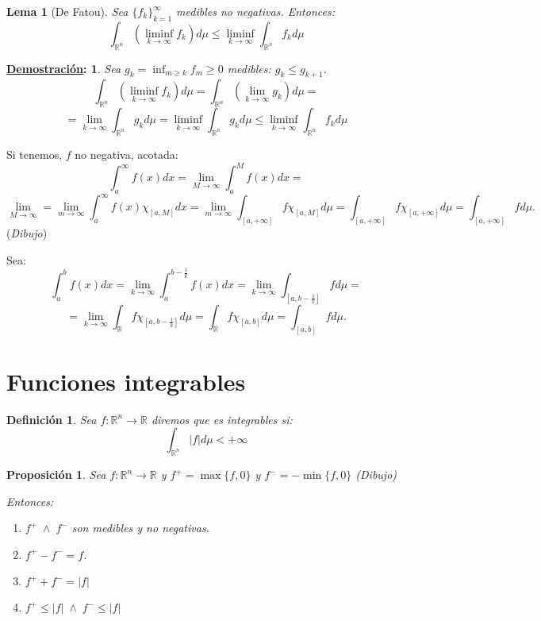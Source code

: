 \documentclass[10pt,a4paper,openright]{book}
\theoremstyle{break}
\newtheorem*{defi}{Definición}
\newtheorem*{lema}{Lema}
\newtheorem*{prop}{Proposición}
\newtheorem*{demo}{\underline{Demostración}:}
\begin{document}
\begin{lema}[De Fatou]
Sea $\{f_k\}_{k=1}^{\infty}$ medibles no negativas. Entonces: 
$$\int_{\mathbb{R}^n} \left( \liminf_{k \rightarrow \infty}f_k \right) d \mu \le \liminf_{k \rightarrow \infty} \int_{\mathbb{R}^n} f_k d \mu $$
\end{lema}
\begin{demo}
Sea $g_k = \inf_{m \ge k} f_m \ge 0$ medibles: $g_k \le g_{k + 1}$.
$$\int_{\mathbb{R}^n} \left(\liminf_{k \rightarrow \infty}f_k \right) d \mu = \int_{\mathbb{R}^n} \left(\lim_{k \rightarrow \infty}g_k \right) d \mu = $$
$$= \lim_{k \rightarrow \infty} \int_{\mathbb{R}^n} g_k d \mu = \liminf_{k \rightarrow \infty}\int_{\mathbb{R}^n} g_k d \mu \le \liminf_{k \rightarrow \infty} \int_{\mathbb{R}^n} f_k d \mu$$
\end{demo}

Si tenemos, $f$ no negativa, acotada: 
$$\int_a^{\infty} f \left(x\right) dx = \lim_{M \rightarrow \infty} \int_a^M f \left(x\right) dx =$$
$$\lim_{M \rightarrow \infty} = \lim_{m \rightarrow \infty} \int_a^{\infty} f \left(x\right) \chi_{\left[a, M\right]}dx = \lim_{m \rightarrow \infty} \int_{\left[a, +\infty\right]} f \chi_{\left[a, M\right]} d \mu = \int_{\left[a, +\infty\right]} f \chi_{\left[a, +\infty\right]} d \mu = \int_{\left[a, +\infty\right]} f d \mu. $$
(\textit{Dibujo})

Sea:
$$\int_a^b f \left(x\right) dx = \lim_{k \rightarrow \infty}\int_a^{b - \frac{1}{k}} f \left(x\right) dx = \lim_{k \rightarrow \infty} \int_{\left[a, b - \frac{1}{k}\right]} f d \mu =$$
$$= \lim_{k \rightarrow \infty} \int_{\mathbb{R}} f \chi_{\left[a, b - \frac{1}{k}\right]} d \mu = \int_{\mathbb{R}} f \chi_{\left[a, b\right]} d \mu = \int_{\left[a, b\right]} f d \mu.$$

\chapter*{Funciones integrables}%
\label{cha:funciones_integrables}
\begin{defi}
Sea $f: \mathbb{R}^{n} \rightarrow \mathbb{R}$ diremos que es integrables si: 
$$\int_{\mathbb{R}^n} \vert f \vert d \mu < +\infty$$
\end{defi}

\begin{prop}
Sea $f: \mathbb{R}^{n} \rightarrow \mathbb{R}$ y $f^+ = \max \{f, 0 \}$ y $f^- = -\min \{f, 0\}$
(\textit{Dibujo})

Entonces:
\begin{enumerate}
\item $f^+ \; \land \; f^-$ son medibles y no negativas.
\item $f^+ - f^- = f$. 
\item $f^+ + f^- = \vert f \vert$
\item $f^+ \le \vert f \vert\; \land \;f^- \le \vert f \vert$ 
\end{enumerate}    
\end{prop}
\end{document}
